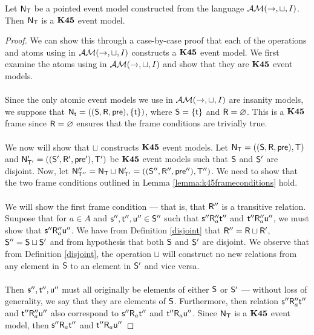 \begin{lemma}
	Let $\evM_\evT$ be a pointed event model constructed from the language $\EM(\to,\sqcup,I)$.
	Then $\evM_\evT$ is a $\AXKFF$ event model.
\end{lemma}
\begin{proof}
	We can show this through a case-by-case proof that each of the operations and atoms using in
	$\EM(\to,\sqcup,I)$ constructs a $\AXKFF$ event model.
	We first examine the atoms using in $\EM(\to,\sqcup,I)$ and show that they are $\AXKFF$ event
	models.\\
	\\
	Since the only atomic event models we use in $\EM(\to,\sqcup,I)$ are insanity models, we suppose
	that $\evM_{\evt} = ((\evS,\evR,\evpr),\{\evt\})$, where $\evS = \{\evt\}$ and $\evR =
	\varnothing$.
	This is a $\AXKFF$ frame since $\evR = \varnothing$ ensures that the frame conditions
	are trivially true.\\
	\\
	We now will show that $\sqcup$ constructs $\AXKFF$ event models.
	Let $\evM_\evT = ((\evS,\evR,\evpr),\evT)$ and $\evM'_{\evT'} = ((\evS',\evR',\evpr'),\evT')$ be
	$\AXKFF$ event models such that $\evS$ and $\evS'$ are disjoint.
	Now, let $\evM''_{\evT''} = \evM_\evT \sqcup \evM'_{\evT'} = ((\evS'',\evR'',\evpr''),\evT'')$.
	We need to show that the two frame conditions outlined in Lemma \ref{lemma:k45frameconditions}
	hold.\\
	\\
	We will show the first frame condition --- that is, that $\evR''$ is a transitive relation.
	Suupose that for $a \in A$ and $\evs'', \evt'', \evu'' \in \evS''$ such that $\evs'' \evR''_a
	\evt''$ and $\evt'' \evR''_a \evu''$, we must show that $\evs'' \evR''_a \evu''$.
	We have from Definition \ref{disjoint} that $\evR'' = \evR \sqcup \evR'$, $\evS'' = \evS \sqcup
	\evS'$ and from hypothesis that both $\evS$ and $\evS'$ are disjoint.
	We observe that from Definition \ref{disjoint}, the operation $\sqcup$ will construct no new
	relations from any element in $\evS$ to an element in $\evS'$ and vice versa.\\
	\\
	Then $\evs'', \evt'', \evu''$ must all originally be elements of either $\evS$ or $\evS'$ ---
	without loss of generality, we say that they are elements of $\evS$.
	Furthermore, then relation $\evs'' \evR''_a \evt''$ and $\evt'' \evR''_a \evu''$ also correspond
	to $\evs'' \evR_a \evt''$ and $\evt'' \evR_a \evu''$.
	Since $\evM_\evT$ is a $\AXKFF$ event model, then $\evs'' \evR_a \evt''$ and $\evt'' \evR_a \evu''$

\end{proof}
